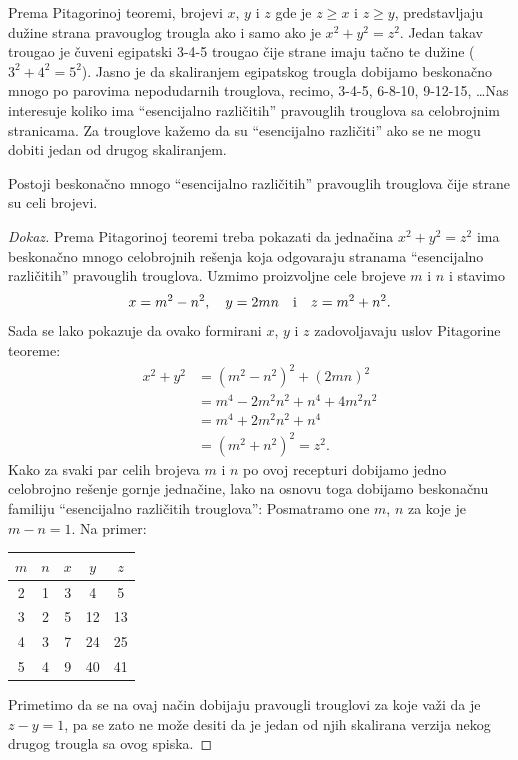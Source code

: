 \begin{EX}\label{ft05.ex.pitagorine-3}
  Prema Pitagorinoj teoremi, brojevi $x$, $y$ i $z$ gde je $z \ge x$ i $z \ge y$,
  predstavljaju du\v zine strana pravouglog trougla ako i samo ako je $x^2 + y^2 = z^2$.
  Jedan takav trougao je \v cuveni egipatski 3-4-5 trougao \v cije strane imaju ta\v cno te du\v zine
  ($3^2 + 4^2 = 5^2$). Jasno je da skaliranjem egipatskog trougla dobijamo beskona\v cno mnogo
  po parovima nepodudarnih trouglova, recimo, 3-4-5, 6-8-10, 9-12-15, \ldots\quad Nas interesuje
  koliko ima \enquote{esencijalno razli\v citih} pravouglih trouglova sa celobrojnim stranicama.
  Za trouglove ka\v zemo da su \enquote{esencijalno razli\v citi} ako se ne mogu dobiti jedan od drugog skaliranjem.

  Postoji beskona\v cno mnogo \enquote{esencijalno razli\v citih} pravouglih trouglova \v cije strane su celi brojevi.
\end{EX}
\begin{proof}[Dokaz]
  Prema Pitagorinoj teoremi treba pokazati da jedna\v cina $x^2 + y^2 = z^2$ ima beskona\v cno mnogo celobrojnih re\v senja
  koja odgovaraju stranama \enquote{esencijalno razli\v citih} pravouglih trouglova.
  Uzmimo proizvoljne cele brojeve $m$ i $n$ i stavimo
  $$
    x = m^2 - n^2, \quad y = 2mn \text{\quad i\quad} z = m^2 + n^2.
  $$
  Sada se lako pokazuje da ovako formirani $x$, $y$ i $z$ zadovoljavaju uslov Pitagorine teoreme:
  \begin{align*}
  x^2 + y^2
  &= (m^2 - n^2)^2 + (2mn)^2\\
  &= m^4 - 2 m^2 n^2 + n^4 + 4 m^2 n^2\\
  &= m^4 + 2 m^2 n^2 + n^4\\
  &= (m^2 + n^2)^2 = z^2.
  \end{align*}
  Kako za svaki par celih brojeva $m$ i $n$ po ovoj recepturi dobijamo jedno celobrojno re\v senje
  gornje jedna\v cine, lako na osnovu toga dobijamo beskona\v cnu familiju \enquote{esencijalno razli\v citih trouglova}:
  Posmatramo one $m$, $n$ za koje je $m - n = 1$. Na primer:
  \begin{center}
    \begin{tabular}{|cc|ccc|}
      \hline
      $m$ & $n$ & $x$ & $y$ & $z$ \\
      \hline
      2 & 1 & 3 & 4 & 5 \\
      3 & 2 & 5 & 12 & 13 \\
      4 & 3 & 7 & 24 & 25 \\
      5 & 4 & 9 & 40 & 41 \\
      \hline
    \end{tabular}
  \end{center}
  Primetimo da se na ovaj na\v cin dobijaju pravougli trouglovi za koje va\v zi da je $z - y = 1$, pa se zato ne mo\v ze
  desiti da je jedan od njih skalirana verzija nekog drugog trougla sa ovog spiska.
\end{proof}

